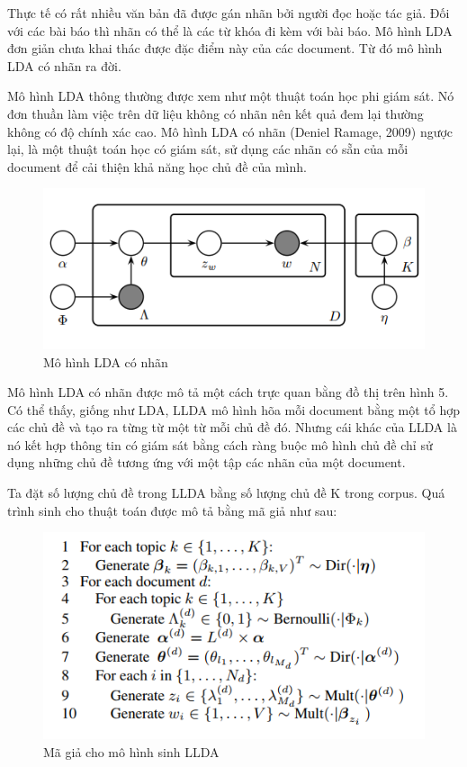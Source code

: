 \documentclass[12pt,a4paper]{article}
\begin{document}
Thực tế có rất nhiều văn bản đã được gán nhãn bởi người đọc hoặc tác giả. Đối với các bài báo thì nhãn có thể là các từ khóa đi kèm với bài báo. Mô hình LDA đơn giản chưa khai thác được đặc điểm này của các document. Từ đó mô hình LDA có nhãn ra đời.


Mô hình LDA thông thường được xem như một thuật toán học phi giám sát. Nó đơn thuần làm việc trên dữ liệu không có nhãn nên kết quả đem lại thường không có độ chính xác cao. Mô hình LDA có nhãn (Deniel Ramage, 2009) ngược lại, là một thuật toán học có giám sát, sử dụng các nhãn có sẵn của mỗi document để cải thiện khả năng học chủ đề của mình.

\begin{figure}[h]
    \centering
    \includegraphics[width=.8\textwidth]{llda}
    \caption{Mô hình LDA có nhãn}
    \label{fig:llda}
\end{figure}


Mô hình LDA có nhãn được mô tả một cách trực quan bằng đồ thị trên hình 5. Có thể thấy, giống như LDA, LLDA mô hình hõa mỗi document bằng một tổ hợp các chủ đề và tạo ra từng từ một từ mỗi chủ đề đó. Nhưng cái khác của LLDA là nó kết hợp thông tin có giám sát bằng cách ràng buộc mô hình chủ đề chỉ sử dụng những chủ đề tương ứng với một tập các nhãn của một document.

\newpage
Ta đặt số lượng chủ đề trong LLDA bằng số lượng chủ đề K trong corpus. Quá trình sinh cho thuật toán được mô tả bằng mã giả như sau:

\begin{figure}[h]
    \centering
    \includegraphics[width=.6\textwidth]{lldapseudo}
    \caption{Mã giả cho mô hình sinh LLDA}
    \label{fig:lldapseudo}
\end{figure}
\end{document}
